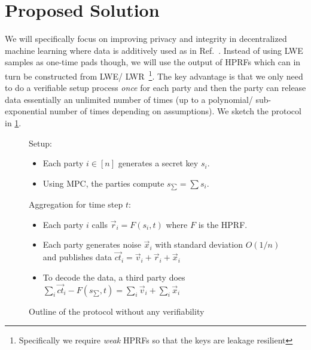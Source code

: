 \newcommand{\summedSK}{s_{\sum}}

\section{Proposed Solution}
We will specifically focus on improving privacy and integrity in decentralized machine learning where data is additively used as in Ref.~\cite{stevens2021efficientdifferentiallyprivatesecure}.
Instead of using LWE samples as one-time pads though, we will use the output of HPRFs which can in turn be constructed from LWE/ LWR~\footnote{Specifically we require \emph{weak} HPRFs so that the keys are leakage resilient}.
The key advantage is that we only need to do a verifiable setup process \emph{once} for each party and then the party can release data essentially an unlimited number of times (up to a polynomial/ sub-exponential number of times depending on assumptions).
We sketch the protocol in \cref{fig:protSimp}.

\begin{figure}[H]
	\begin{mdframed}
		Setup: \begin{itemize}
			\item Each party $i \in [n]$ generates a secret key $s_i.$
			\item Using MPC, the parties compute $\summedSK = \sum s_i.$
		\end{itemize}
		Aggregation for time step $t$: \begin{itemize}
			\item Each party $i$ calls $\vec{r}_i = F(s_i, t)$  where $F$ is the HPRF.
			\item Each party generates noise $\vec{x}_i$ with standard deviation $O(1/n)$ and publishes data $\overrightarrow{ct}_i = \vec{v}_i + \vec{r}_i + \vec{x}_i$ 
			\item To decode the data, a third party does $\sum_i \overrightarrow{ct}_i - F(\summedSK, t) = \sum_i \vec{v}_i + \sum_i \vec{x}_i$
		\end{itemize}
	\end{mdframed}
	\caption{Outline of the protocol without any verifiability}
	\label{fig:protSimp}
\end{figure}


